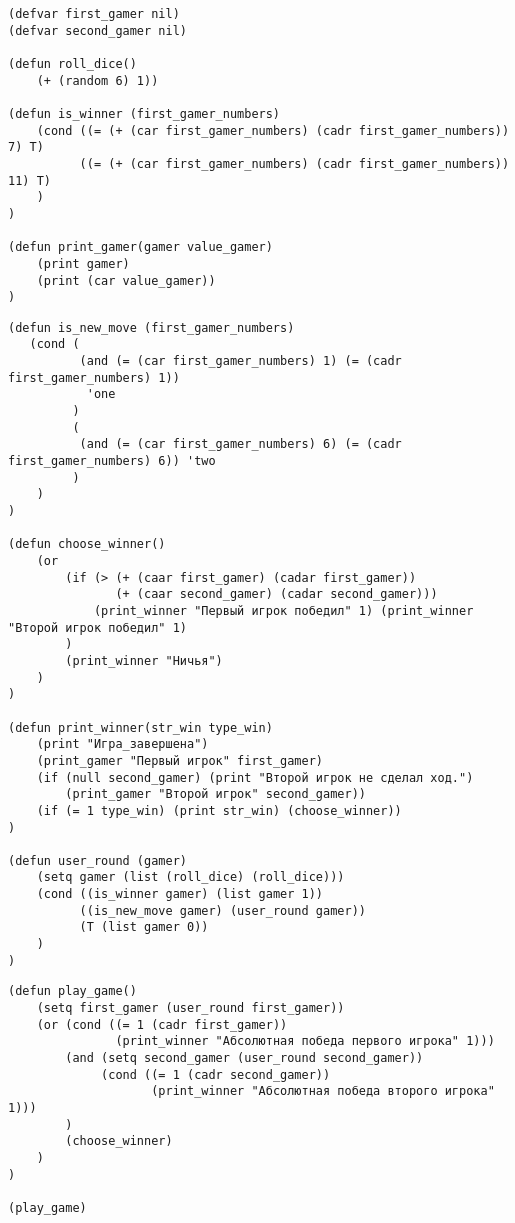 \begin{lstlisting}[basicstyle=\footnotesize,caption= Программный код <<Игра в кости>>]
(defvar first_gamer nil)
(defvar second_gamer nil)

(defun roll_dice()
	(+ (random 6) 1))

(defun is_winner (first_gamer_numbers)
	(cond ((= (+ (car first_gamer_numbers) (cadr first_gamer_numbers)) 7) T)
		  ((= (+ (car first_gamer_numbers) (cadr first_gamer_numbers)) 11) T)
    )
)

(defun print_gamer(gamer value_gamer)
	(print gamer)
	(print (car value_gamer))
)
\end{lstlisting}
\newpage

\begin{lstlisting}[basicstyle=\footnotesize,caption= Программный код <<Игра в кости>> (продолжение)]
(defun is_new_move (first_gamer_numbers)
   (cond (
   		  (and (= (car first_gamer_numbers) 1) (= (cadr first_gamer_numbers) 1))
		   'one
		 )
		 (
		  (and (= (car first_gamer_numbers) 6) (= (cadr first_gamer_numbers) 6)) 'two
		 )
    )
)

(defun choose_winner()
	(or 
		(if (> (+ (caar first_gamer) (cadar first_gamer)) 
			   (+ (caar second_gamer) (cadar second_gamer)))
			(print_winner "Первый игрок победил" 1) (print_winner "Второй игрок победил" 1)
		)
		(print_winner "Ничья")
	)
)

(defun print_winner(str_win type_win)    
	(print "Игра_завершена")
	(print_gamer "Первый игрок" first_gamer)
	(if (null second_gamer) (print "Второй игрок не сделал ход.") 
		(print_gamer "Второй игрок" second_gamer))
	(if (= 1 type_win) (print str_win) (choose_winner))
)

(defun user_round (gamer)
	(setq gamer (list (roll_dice) (roll_dice)))
	(cond ((is_winner gamer) (list gamer 1))
		  ((is_new_move gamer) (user_round gamer))
		  (T (list gamer 0)) 
	)
)
\end{lstlisting}
\newpage

\begin{lstlisting}[basicstyle=\footnotesize,caption= Программный код <<Игра в кости>>(продолжение)]
(defun play_game()
	(setq first_gamer (user_round first_gamer))
	(or (cond ((= 1 (cadr first_gamer))
			   (print_winner "Абсолютная победа первого игрока" 1)))
		(and (setq second_gamer (user_round second_gamer))
			 (cond ((= 1 (cadr second_gamer)) 
			 		(print_winner "Абсолютная победа второго игрока" 1)))
		)
		(choose_winner)
	)
)        

(play_game)
\end{lstlisting}

